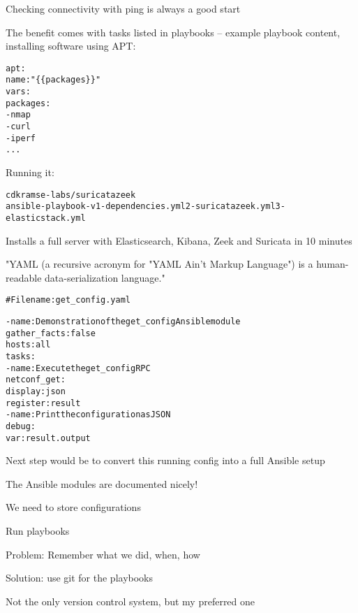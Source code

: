 \documentclass[Screen16to9,17pt]{foils}
\begin{document}
\begin{list2}
\item Checking connectivity with ping is always a good start
\end{list2}



The benefit comes with tasks listed in playbooks -- example playbook content, installing software using APT:
\begin{alltt}\footnotesize
apt:
    name: "\{\{ packages \}\}"
    vars:
      packages:
        - nmap
        - curl
        - iperf
        ...
\end{alltt}

Running it:
\begin{alltt}\footnotesize
cd kramse-labs/suricatazeek
ansible-playbook -v 1-dependencies.yml 2-suricatazeek.yml 3-elasticstack.yml
\end{alltt}
Installs a full server with Elasticsearch, Kibana, Zeek and Suricata in 10 minutes

"YAML (a recursive acronym for "YAML Ain't Markup Language") is a human-readable data-serialization language."



\begin{alltt}\footnotesize
# Filename: get_config.yaml

- name: Demonstration of the get_config Ansible module
  gather_facts: false
  hosts: all
  tasks:
    - name: Execute the get_config RPC
      netconf_get:
        display: json
      register: result
    - name: Print the configuration as JSON
      debug:
        var: result.output
\end{alltt}

\begin{list2}
\item Next step would be to convert this running config into a full Ansible setup
\item The Ansible modules are documented nicely!\\{\footnotesize
{}}
\end{list2}



\begin{list2}
\item We need to store configurations
\item Run playbooks
\item Problem: Remember what we did, when, how
\item Solution: use git for the playbooks
\item Not the only version control system, but my preferred one
\end{list2}
\end{document}
